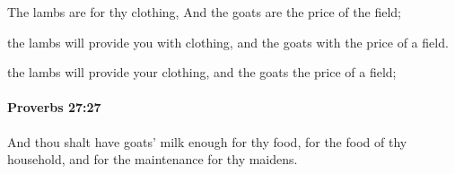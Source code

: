 			\begin{versebox}
					\item[BHS] 
					\item[ASV] The lambs are for thy clothing, And the goats are the price of the field;
					\item[NIV] the lambs will provide you with clothing, and the goats with the price of a field.
					\item[NRSV] the lambs will provide your clothing, and the goats the price of a field;
			\end{versebox}

		\paragraph{Proverbs 27:27} %
			\label{PROVERBS-27-27}

			And thou shalt have goats’ milk enough for thy food, for the food of thy household, and for the maintenance for thy maidens.

